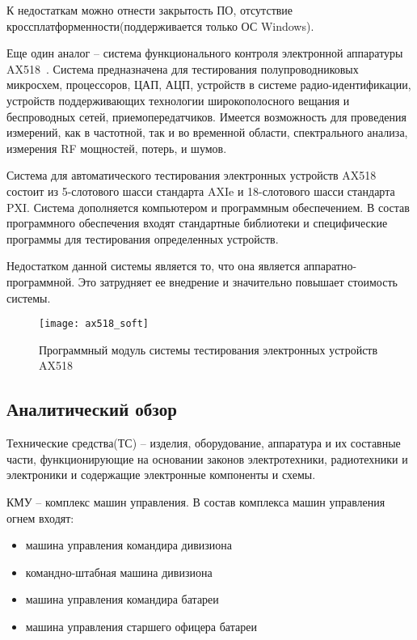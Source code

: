 К недостаткам можно отнести закрытость ПО, отсутствие кроссплатформенности(поддерживается только ОС Windows).

Еще один аналог -- система функционального контроля электронной аппаратуры AX518~\cite{AX518}. Система предназначена для тестирования полупроводниковых микросхем, процессоров, ЦАП, АЦП, устройств в системе радио-идентификации, устройств поддерживающих технологии широкополосного вещания и беспроводных сетей, приемопередатчиков.
Имеется возможность для проведения измерений, как в частотной, так и во временной области, спектрального анализа, измерения RF мощностей, потерь, и шумов.

Система для автоматического тестирования электронных устройств \break AX518 состоит из 5-слотового шасси стандарта AXIe и 18-слотового шасси стандарта PXI.
Система дополняется компьютером и программным обеспечением.
В состав программного обеспечения входят стандартные библиотеки и специфические программы для тестирования определенных устройств.

Недостатком данной системы является то, что она является аппаратно-программной. Это затрудняет ее внедрение и
значительно повышает стоимость системы.

\begin{figure}[ht]
	\centering
	\texttt{[image: ax518\_soft]}
	\caption{Программный модуль системы тестирования электронных устройств AX518~\cite{AX518}}
	\label{fig:lit_reiview:analogues:ax518_soft}
\end{figure}

\subsection{Аналитический обзор}
\label{sub:lit_review:analitics}
Технические средства(ТС) --  изделия, оборудование, аппаратура и их составные части, функционирующие на основании законов электротехники, радиотехники и электроники и содержащие электронные компоненты и схемы.

КМУ -- комплекс машин управления.
В состав комплекса машин управления огнем входят:
\begin{itemize}
	\item машина управления командира дивизиона~\cite{div_car}
	\item командно-штабная машина дивизиона
	\item машина управления командира батареи
	\item машина управления старшего офицера батареи
\end{itemize}

